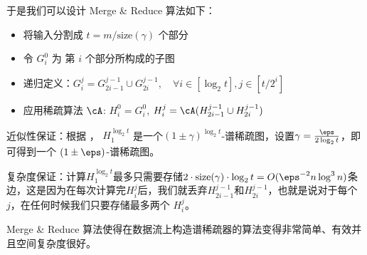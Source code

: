于是我们可以设计 Merge \& Reduce 算法如下：
\begin{itemize}
    \item 将输入分割成 $t=m/\text{size}(\gamma)$ 个部分
    \item 令 $G_i^0$ 为 第 $i$ 个部分所构成的子图
    \item 递归定义：$G_i^j=G_{2i-1}^{j-1}\cup G_{2i}^{j-1},\quad \forall i\in[\log_2t],j\in [t/2^i]$
    \item 应用稀疏算法 $\cA$: $H_i^0=G_i^0$, $H_i^j=\cA(H_{2i-1}^{j-1}\cup H_{2i}^{j-1})$
\end{itemize}

近似性保证：根据 ， $H_1^{\log_2t}$ 是一个$(1\pm\gamma)^{\log_2t}$-谱稀疏图，设置$\gamma=\frac{\eps}{2\log_2t}$，即可得到一个 $(1\pm\eps)$-谱稀疏图。

复杂度保证：计算$H_1^{\log_2t}$最多只需要存储$2\cdot \text{size}(\gamma)\cdot \log_2t=O(\eps^{-2}n\log^3n)$条边，这是因为在每次计算完$H_i^j$后，我们就丢弃$H_{2i-1}^{j-1} $和$ H_{2i}^{j-1}$，也就是说对于每个 $j$，在任何时候我们只要存储最多两个 $H_i^j$。

Merge \& Reduce 算法使得在数据流上构造谱稀疏器的算法变得非常简单、有效并且空间复杂度很好。
% 
